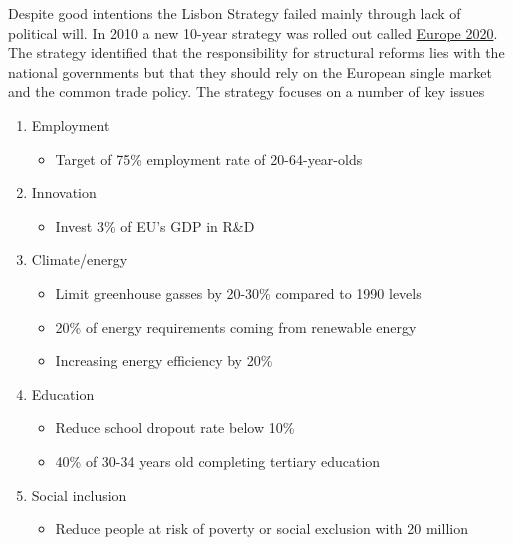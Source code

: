 \documentclass{tufte-handout}
\begin{document}
Despite good intentions the Lisbon Strategy failed mainly through lack of political will. 
In 2010 a new 10-year strategy was rolled out called \href{http://ec.europa.eu/europe2020/europe-2020-in-a-nutshell/index_en.htm}{Europe 2020}. 
The strategy identified that the responsibility for structural reforms lies with the national governments but that they should rely on the European single market and the common trade policy. 
The strategy focuses on a number of key issues
\begin{enumerate}
  \item Employment
  \begin{itemize}
    \item Target of 75\% employment rate of 20-64-year-olds
  \end{itemize}
  \item Innovation
  \begin{itemize}
    \item Invest 3\% of EU's GDP in R\&D
  \end{itemize}
  \item Climate/energy
  \begin{itemize}
    \item Limit greenhouse gasses by 20-30\% compared to 1990 levels
    \item 20\% of energy requirements coming from renewable energy
    \item Increasing energy efficiency by 20\%
  \end{itemize}
  \item Education
  \begin{itemize}
    \item Reduce school dropout rate below 10\%
    \item 40\% of 30-34 years old completing tertiary education
  \end{itemize}
  \item Social inclusion
  \begin{itemize}  
    \item Reduce people at risk of poverty or social exclusion with 20 million
  \end{itemize}
\end{enumerate}


\end{document}
